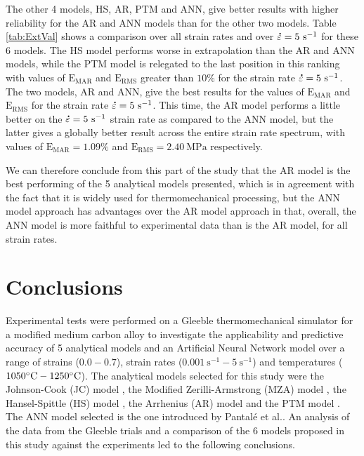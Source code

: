 \documentclass[metals,article,submit,pdftex,moreauthors]{Definitions/mdpi}
\makeatletter
\DeclareRobustCommand{\mdot}[1]{\accentset{\mbox{\bfseries .}}{#1}}
\DeclareRobustCommand{\eal}{et al.\@\xspace}
\DeclareRobustCommand{\RMSE}{\text{E}_\text{RMS}}
\DeclareRobustCommand{\MARE}{\text{E}_\text{MAR}}
\DeclareRobustCommand{\ps}{\text{s}^{-1}}
\DeclareRobustCommand{\MPa}{\text{MPa}}
\makeatother
\begin{document}
The other 4 models, HS, AR, PTM and ANN, give better results with higher reliability for the AR and ANN models than for the other two models.
Table \ref{tab:ExtVal} shows a comparison over all strain rates and over $\mdot\varepsilon=5~\ps$ for these 6 models.
The HS model performs worse in extrapolation than the AR and ANN models, while the PTM model is relegated to the last position in this ranking with values of $\MARE$ and $\RMSE$ greater than $10\%$ for the strain rate $\mdot\varepsilon=5~\ps$.
The two models, AR and ANN, give the best results for the values of $\MARE$ and $\RMSE$ for the strain rate $\mdot\varepsilon=5~\ps$.
This time, the AR model performs a little better on the $\mdot\varepsilon=5~\ps$ strain rate as compared to the ANN model, but the latter gives a globally better result across the entire strain rate spectrum, with values of $\MARE=1.09\%$ and $\RMSE=2.40~\MPa$ respectively.

We can therefore conclude from this part of the study that the AR model is the best performing of the 5 analytical models presented, which is in agreement with the fact that it is widely used for thermomechanical processing, but the ANN model approach has advantages over the AR model approach in that, overall, the ANN model is more faithful to experimental data than is the AR model, for all strain rates.

\section{Conclusions\label{sec:Conclusion}}

Experimental tests were performed on a Gleeble thermomechanical simulator for a modified medium carbon alloy to investigate the applicability and predictive accuracy of 5 analytical models and an Artificial Neural Network model over a range of strains ($0.0-0.7$), strain rates ($0.001~\ps-5~\ps$) and temperatures ($1050\celsius-1250\celsius$).
The analytical models selected for this study were the Johnson-Cook (JC) model \cite{Johnson-1983}, the Modified Zerilli-Armstrong (MZA) model \cite{Samantaray-2009}, the Hansel-Spittle (HS) model \cite{Hensel-1978}, the Arrhenius (AR) model \cite{Sellars-1966} and the PTM model \cite{TizeMha-2022}.
The ANN model selected is the one introduced by Pantalé \eal \cite{Pantale-2021}.
An analysis of the data from the Gleeble trials and a comparison of the 6 models proposed in this study against the experiments led to the following conclusions.
\end{document}
